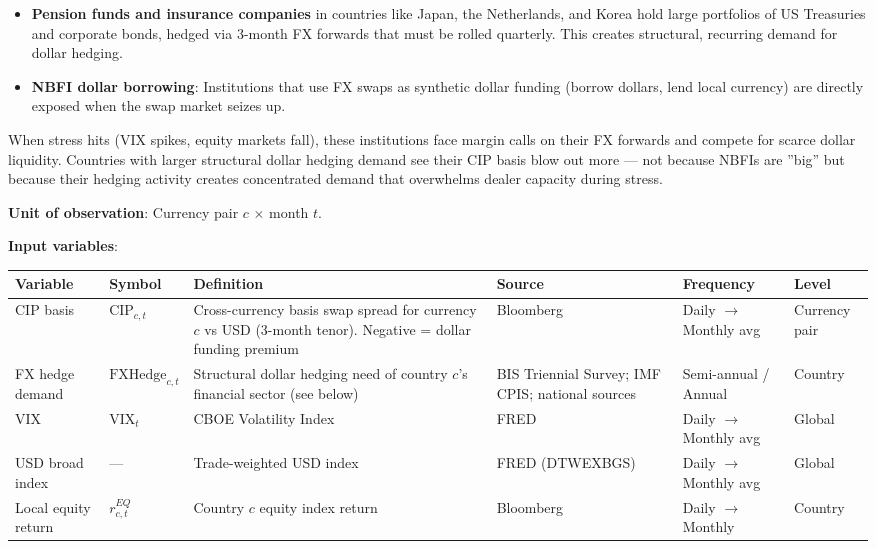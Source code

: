 \documentclass[11pt,a4paper]{article}
\begin{document}
\begin{itemize}
\item \textbf{Pension funds and insurance companies} in countries like Japan, the Netherlands, and Korea hold large portfolios of US Treasuries and corporate bonds, hedged via 3-month FX forwards that must be rolled quarterly. This creates structural, recurring demand for dollar hedging.
\item \textbf{NBFI dollar borrowing}: Institutions that use FX swaps as synthetic dollar funding (borrow dollars, lend local currency) are directly exposed when the swap market seizes up.

\end{itemize}
When stress hits (VIX spikes, equity markets fall), these institutions face margin calls on their FX forwards and compete for scarce dollar liquidity. Countries with larger structural dollar hedging demand see their CIP basis blow out more --- not because NBFIs are ''big'' but because their hedging activity creates concentrated demand that overwhelms dealer capacity during stress.

\textbf{Unit of observation}: Currency pair $c$ $\times$ month $t$.

\textbf{Input variables}:


{\small
\begin{longtable}{|p{}|p{}|p{}|p{}|p{}|p{}|}
\hline
\textbf{Variable} & \textbf{Symbol} & \textbf{Definition} & \textbf{Source} & \textbf{Frequency} & \textbf{Level} \\
\hline
\endhead
CIP basis & $\text{CIP}_{c,t}$ & Cross-currency basis swap spread for currency $c$ vs USD (3-month tenor). Negative = dollar funding premium & Bloomberg & Daily $\rightarrow$ Monthly avg & Currency pair \\
\hline
FX hedge demand & $\text{FXHedge}_{c,t}$ & Structural dollar hedging need of country $c$'s financial sector (see below) & BIS Triennial Survey; IMF CPIS; national sources & Semi-annual / Annual & Country \\
\hline
VIX & $\text{VIX}_t$ & CBOE Volatility Index & FRED & Daily $\rightarrow$ Monthly avg & Global \\
\hline
USD broad index & --- & Trade-weighted USD index & FRED (DTWEXBGS) & Daily $\rightarrow$ Monthly avg & Global \\
\hline
Local equity return & $r_{c,t}^{EQ}$ & Country $c$ equity index return & Bloomberg & Daily $\rightarrow$ Monthly & Country \\
\hline
\end{longtable}
}
\end{document}

